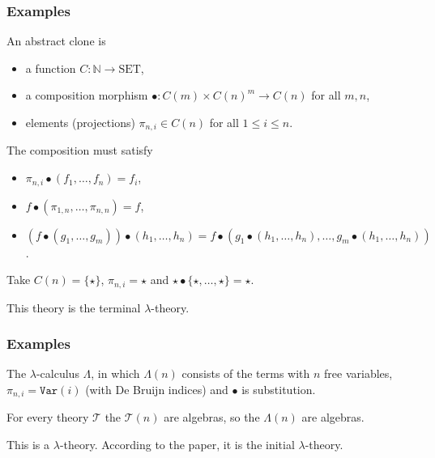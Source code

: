 \documentclass[aspectratio=169]{fancyslides} %
\begin{document}
  \begin{frame}
    \frametitle{Examples}

    \begin{definition}
      An abstract clone is
      \begin{itemize}
        \item a function $ C : \mathbb N \to \mathrm{SET} $,
        \item a composition morphism $ \bullet: C(m) \times C(n)^m \to C(n) $ for all $ m, n $,
        \item elements (projections) $ \pi_{n, i} \in C(n) $ for all $ 1 \leq i \leq n $.
      \end{itemize}
      The composition must satisfy
      \begin{itemize}
        \item $ \pi_{n, i} \bullet (f_1, \dots, f_n) = f_i $,
        \item $ f \bullet (\pi_{1, n}, \dots, \pi_{n, n}) = f $,
        \item $ (f \bullet (g_1, \dots, g_m)) \bullet (h_1, \dots, h_n) = f \bullet (g_1 \bullet (h_1, \dots, h_n), \dots, g_m \bullet (h_1, \dots, h_n)) $.
      \end{itemize}
    \end{definition}

    \vfill

    \begin{example}
      Take $ C(n) = \{ \star \} $, $ \pi_{n, i} = \star $ and $ \star \bullet \{ \star, \dots, \star \} = \star $.

      This theory is the terminal $ \lambda $-theory.
    \end{example}
  \end{frame}

  \begin{frame}
    \frametitle{Examples}

    The $ \lambda $-calculus $ \Lambda $, in which $ \Lambda(n) $ consists of the terms with $ n $ free variables, $ \pi_{n, i} = \texttt{Var}(i) $ (with De Bruijn indices) and $ \bullet $ is substitution.

    \pause
    \vfill

    For every theory $ \mathcal T $ the $ \mathcal T(n) $ are algebras, so the $ \Lambda(n) $ are algebras.

    \pause
    \vfill

    This is a $ \lambda $-theory. According to the paper, it is the initial $ \lambda $-theory.
  \end{frame}
\end{document}
